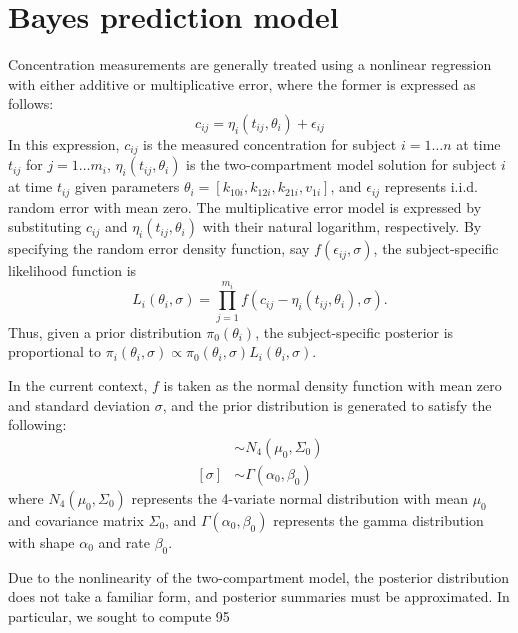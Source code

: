 \documentclass{article}
\begin{document}
\section{Bayes prediction model}
Concentration measurements are generally treated using a nonlinear regression with either additive or multiplicative error, where the former is expressed as follows:
\begin{displaymath}
c_{ij} = \eta_i(t_{ij}, \theta_i) + \epsilon_{ij}
\end{displaymath}
\noindent In this expression, $c_{ij}$ is the measured concentration for subject $i = 1 \ldots n$ at time $t_{ij}$ for $j = 1 \ldots m_i$, $\eta_i(t_{ij}, \theta_i)$ is the two-compartment model solution for subject $i$ at time $t_{ij}$ given parameters $\theta_i = [k_{10i}, k_{12i}, k_{21i}, v_{1i}]$, and $\epsilon_{ij}$ represents i.i.d. random error with mean zero. The multiplicative error model is expressed by substituting $c_{ij}$ and $\eta_i(t_{ij}, \theta_i)$ with their natural logarithm, respectively. By specifying the random error density function, say $f(\epsilon_{ij}, \sigma)$, the subject-specific likelihood function is 
\begin{displaymath}
L_i(\theta_i, \sigma) = \prod_{j=1}^{m_i} f(c_{ij} - \eta_i(t_{ij}, \theta_i), \sigma).
\end{displaymath}
\noindent Thus, given a prior distribution $\pi_0(\theta_i)$, the subject-specific posterior is proportional to $\pi_i(\theta_i, \sigma) \propto \pi_0(\theta_i,\sigma)L_i(\theta_i,\sigma)$.

In the current context, $f$ is taken as the normal density function with mean zero and standard deviation $\sigma$, and the prior distribution is generated to satisfy the following:
\begin{align}
[\log k_{10}, \log k_{12}, \log k_{21}, \log v_1] &\sim N_4(\mu_0, \Sigma_0) \\
[\sigma] &\sim \Gamma(\alpha_0, \beta_0)
\end{align}
\noindent where $N_4(\mu_0, \Sigma_0)$ represents the 4-variate normal distribution with mean $\mu_0$ and covariance matrix $\Sigma_0$, and $\Gamma(\alpha_0, \beta_0)$ represents the gamma distribution with shape $\alpha_0$ and rate $\beta_0$. 

Due to the nonlinearity of the two-compartment model, the posterior distribution does not take a familiar form, and posterior summaries must be approximated. In particular, we sought to compute 95%
\end{document}
